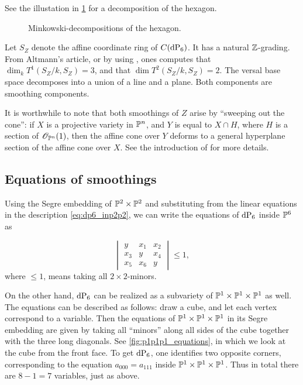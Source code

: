 See the illustation in \cref{fig:minkowski_decompositions} for a decomposition of the hexagon.

\begin{figure}
\centering 

\caption{Minkowski-decompositions of the hexagon.}
\label{fig:minkowski_decompositions}
\end{figure}

Let $S_Z$ denote the affine coordinate ring of $C(\dP6)$. It has a natural $\Z$-grading. From Altmann's article, or by using \MM, ones computes that $\dim_k T^1(S_Z/k,S_Z)=3$, and that $\dim T^2(S_Z/k, S_Z)=2$. The versal base space decomposes into a union of a line and a plane. Both components are smoothing components.

It is worthwhile to note that both smoothings of $Z$ arise by ``sweeping out the cone'': if $X$ is a projective variety in $\P^n$, and $Y$ is equal to $X \cap H$, where $H$ is a section of $\OO_{\P^n}(1)$, then the affine cone over $Y$ deforms to a general hyperplane section of the affine cone over $X$. See the introduction of \cite{stevens_deformations} for more details.

\subsection{Equations of smoothings}

Using the Segre embedding of $\P^2 \times \P^2$ and substituting from the linear equations in the description \cref{eq:dp6_inp2p2}, we can write the equations of $\dP6$ inside $\P^6$ as

\begin{equation}
\begin{vmatrix}
y & x_1 & x_2 \\
x_3 & y & x_4 \\
x_5 & x_6 & y
\end{vmatrix} \leq 1,
\end{equation}
where $\leq 1$, means taking all $2 \times 2$-minors.

On the other hand, $\dP6$ can be realized as a subvariety of $\P^1 \times \P^1 \times \P^1$ as well. The equations can be described as follows: draw a cube, and let each vertex correspond to a variable. Then the equations of $\P^1 \times \P^1 \times \P^1$ in its Segre embedding are given by taking all ``minors'' along all sides of the cube together with the three long diagonals. See \cref{fig:p1p1p1_equations}, in which we look at the cube from the front face. To get $\dP6$, one identifies two opposite corners, corresponding to the equation $a_{000}=a_{111}$ inside $\P^1 \times \P^1 \times \P^1$. Thus in total there are $8-1=7$ variables, just as above. 

